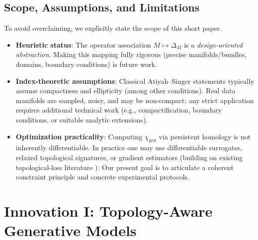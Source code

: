 \documentclass[10pt,leqno]{amsart}
\begin{document}
\subsection{Scope, Assumptions, and Limitations}
To avoid overclaiming, we explicitly state the scope of this short paper.
\begin{itemize}
    \item \textbf{Heuristic status}: The operator association $M \mapsto \Delta_M$ is a \emph{design-oriented abstraction}. Making this mapping fully rigorous (precise manifolds/bundles, domains, boundary conditions) is future work.
    \item \textbf{Index-theoretic assumptions}: Classical Atiyah--Singer statements typically assume compactness and ellipticity (among other conditions). Real data manifolds are sampled, noisy, and may be non-compact; any strict application requires additional technical work (e.g., compactification, boundary conditions, or suitable analytic extensions).
    \item \textbf{Optimization practicality}: Computing $\chi_{\text{gen}}$ via persistent homology is not inherently differentiable. In practice one may use differentiable surrogates, relaxed topological signatures, or gradient estimators (building on existing topological-loss literature \cite{hofer2017deep,clough2020topological}). Our present goal is to articulate a coherent constraint principle and concrete experimental protocols.
\end{itemize}

\section{Innovation I: Topology-Aware Generative Models}
\end{document}

